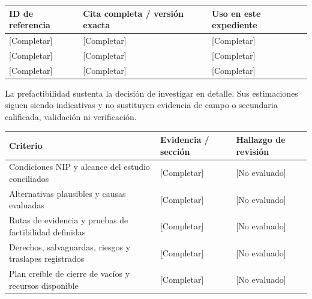 {\sffamily\fontsize{8.3}{10.3}\selectfont\begin{longtable}{@{}P{29.69mm} P{82.48mm} P{52.79mm}@{}}
\toprule
\textbf{ID de referencia} & \textbf{Cita completa / versión exacta} & \textbf{Uso en este expediente}\\\midrule\endhead
\rule{0pt}{7.7mm}[Completar] & [Completar] & [Completar]\\\hline
\rule{0pt}{7.7mm}[Completar] & [Completar] & [Completar]\\\hline
\rule{0pt}{7.7mm}[Completar] & [Completar] & [Completar]\\\hline
\end{longtable}}
\begin{Notice}La prefactibilidad sustenta la decisión de investigar en detalle. Sus estimaciones siguen siendo indicativas y no sustituyen evidencia de campo o secundaria calificada, validación ni verificación.\end{Notice}
{\sffamily\fontsize{8.3}{10.3}\selectfont\begin{longtable}{@{}P{80.84mm} P{42.89mm} P{41.24mm}@{}}
\toprule
\textbf{Criterio} & \textbf{Evidencia / sección} & \textbf{Hallazgo de revisión}\\\midrule\endhead
\rule{0pt}{7.7mm}Condiciones NIP y alcance del estudio conciliados & [Completar] & [No evaluado]\\\hline
\rule{0pt}{7.7mm}Alternativas plausibles y causas evaluadas & [Completar] & [No evaluado]\\\hline
\rule{0pt}{7.7mm}Rutas de evidencia y pruebas de factibilidad definidas & [Completar] & [No evaluado]\\\hline
\rule{0pt}{7.7mm}Derechos, salvaguardas, riesgos y traslapes registrados & [Completar] & [No evaluado]\\\hline
\rule{0pt}{7.7mm}Plan creíble de cierre de vacíos y recursos disponible & [Completar] & [No evaluado]\\\hline
\end{longtable}}
